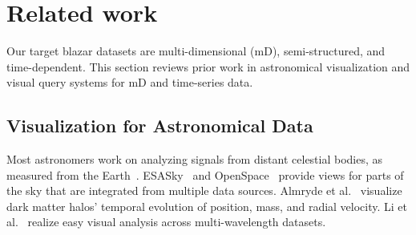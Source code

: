\section{Related work\label{sec:relatedWork}}
Our target blazar datasets are multi-dimensional (mD), semi-structured, and time-dependent.
This section reviews prior work in astronomical visualization and visual query systems for mD and time-series data. 


\subsection{Visualization for Astronomical Data}\label{sec:relatedAstronomy}
Most astronomers work on analyzing signals from distant celestial bodies, as measured from the Earth~\cite{Kent2017}. 
ESASky~\cite{Baines2017} and OpenSpace~\cite{Bock2020} provide views for parts of the sky that are integrated from multiple data sources.
Almryde et al.~\cite{Almryde2016} visualize dark matter halos’ temporal evolution of position, mass, and radial velocity. 
Li et al.~\cite{Li2008} realize easy visual analysis across multi-wavelength datasets.
